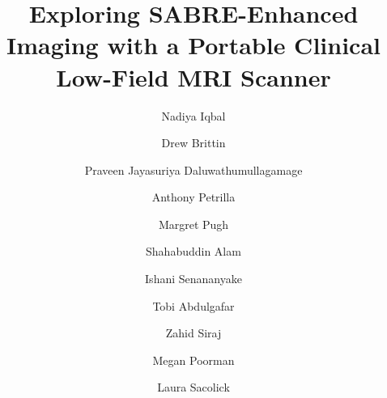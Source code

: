 \documentclass[final,3p,times,twocolumn]{elsarticle}
\begin{document}
\begin{frontmatter}



\title{Exploring SABRE-Enhanced Imaging with a Portable Clinical Low-Field MRI Scanner}


\author[inst1]{Nadiya Iqbal}


\author[inst1]{Drew Brittin}
\author[inst1]{Praveen Jayasuriya Daluwathumullagamage}
\author[inst1]{Anthony Petrilla}
\author[inst1]{Margret Pugh}
\author[inst1]{Shahabuddin Alam}
\author[inst1]{Ishani Senananyake}
\author[inst1]{Tobi Abdulgafar}
\author[inst1]{Zahid Siraj}


\author[inst2]{Megan Poorman}
\author[inst2]{Laura Sacolick}


\end{frontmatter}
\end{document}
